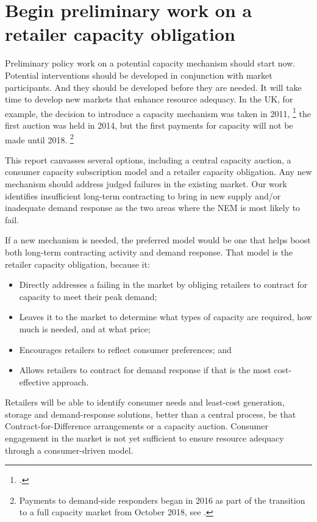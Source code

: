 \documentclass[FrontPage]{grattan}
\begin{document}
\section{Begin preliminary work on a retailer capacity obligation}\label{sec:the-preferred-model-a-retailer-capacity-obligation}
Preliminary policy work on a potential capacity mechanism should start now. Potential interventions should be developed in conjunction with market participants. And they should be developed before they are needed. It will take time to develop new markets that enhance resource adequacy. In the UK, for example, the decision to introduce a capacity mechanism was taken in 2011,%
\footcite{UK2011DECCWhitePaper}
the first auction was held in 2014, but the first payments for capacity will not be made until 2018.%
\footnote{Payments to demand-side responders began in 2016 as part of the transition to a full capacity market from October 2018, see \textcite{Engie2016UKCapacityMarket}.}

This report canvasses several options, including a central capacity auction, a consumer capacity subscription model and a retailer capacity obligation. Any new mechanism should address judged failures in the existing market. Our work identifies insufficient long-term contracting to bring in new supply and/or inadequate demand response as the two areas where the NEM is most likely to fail.

If a new mechanism is needed, the preferred model would be one that helps boost both long-term contracting activity and demand response. That model is the retailer capacity obligation, because it:
\begin{itemize}
    \item Directly addresses a failing in the market by obliging retailers to contract for capacity to meet their peak demand;
    \item Leaves it to the market to determine what types of capacity are required, how much is needed, and at what price;
    \item Encourages retailers to reflect consumer preferences; and
    \item Allows retailers to contract for demand response if that is the most cost-effective approach.
\end{itemize}

Retailers will be able to identify consumer needs and least-cost generation, storage and demand-response solutions, better than a central process, be that Contract-for-Difference arrangements or a capacity auction. Consumer engagement in the market is not yet sufficient to ensure resource adequacy through a consumer-driven model.
\end{document}
